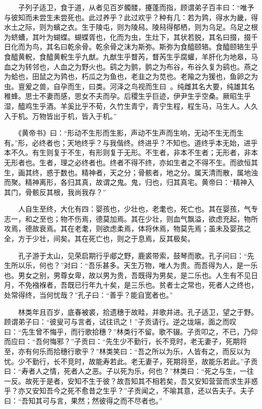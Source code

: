 　　子列子适卫，食于道，从者见百岁髑髅，攓蓬而指，顾谓弟子百丰曰：``唯予与彼知而未尝生未尝死也。此过养乎？此过欢乎？种有几：若为鹑，得水为畿，得水土之际，则为蠙之衣。生于陵屯，则为陵舄。陵舄得郁栖，则为乌足。乌足之根为蛴螬，其叶为蝴蝶。蝴蝶胥也，化而为虫，生灶下，其状若脱，其名曰掇，掇千日化而为鸟，其名曰乾余骨。乾余骨之沫为斯弥。斯弥为食醯颐辂。食醯颐辂生乎食醯黄軦，食醯黄軦生乎九猷。九猷生乎瞀芮，瞀芮生乎腐蠸，羊肝化为地皋，马血之为转邻也，人血之为野火也。鹞之为鹯，鹯之为布谷，布谷久复为鹞也。燕之为蛤也，田鼠之为鹑也，朽瓜之为鱼也，老韭之为苋也。老羭之为猨也，鱼卵之为虫。亶爰之兽，自孕而生，曰类。河泽之鸟视而生曰。纯雌其名大要，纯雄其名稚蜂。思士不妻而感，思女不夫而孕。后稷生乎巨迹，伊尹生乎空桑。厥昭生乎湿，醯鸡生乎酒。羊奚比乎不荀，久竹生青宁，青宁生程，程生马，马生人。人久入于机。万物皆出于机，皆入于机。''

　　《黄帝书》曰：``形动不生形而生影，声动不生声而生响，无动不生无而生有。''形，必终者也；天地终乎？与我偕终。终进乎？不知也。道终乎本无始，进乎本不久。有生则复于不生，有形则复于无形。不生者，非本不生者；无形者，非本无形者也。生者，理之必终者也。终者不得不终，亦如生者之不得不生。而欲恒其生，画其终，惑于数也。精神者，天之分；骨骸者，地之分。属天清而散，属地浊而聚。精神离形，各归其真，故谓之鬼。鬼，归也，归其真宅。黄帝曰：``精神入其门，骨骸反其根，我尚我存？''

　　人自生至终，大化有四：婴孩也，少壮也，老耄也，死亡也。其在婴孩，气专志一，和之至也；物不伤焉，德莫加焉。其在少壮，则血气飘溢，欲虑充起，物所攻焉，德故衰焉。其在老耄，则欲虑柔焉，体将休焉，物莫先焉；虽未及婴孩之全，方于少壮，间矣。其在死亡也，则之于息焉，反其极矣。

　　孔子游于太山，见荣启期行乎郕之野，鹿裘带索，鼓琴而歌。孔子问曰：``先生所以乐，何也？''对曰：``吾乐甚多。天生万物，唯人为贵。而吾得为人，是一乐也。男女之别，男尊女卑，故以男为贵，吾既得为男矣，是二乐也。人生有不见日月，不免襁褓者，吾既已行年九十矣，是三乐也。贫者士之常也，死者人之终也，处常得终，当何忧哉？''孔子曰：``善乎？能自宽者也。''

　　林类年且百岁，底春被裘，拾遗穗于故畦，并歌并进。孔子适卫，望之于野。顾谓弟子曰：``彼叟可与言者，试往讯之！''子贡请行。逆之垅端，面之而叹曰：``先生曾不悔乎，而行歌拾穗？''林类行不留。歌不辍。子贡叩之，不已，乃仰而应曰：``吾何悔邪？''子贡曰：``先生少不勤行，长不竞时，老无妻子，死期将至，亦有何乐而拾穗行歌乎？''林类笑曰：``吾之所以为乐，人皆有之，而反以为忧。少不勤行，长不竞时，故能寿若此。老无妻子，死期将至，故能乐若此。''子贡曰：``寿者人之情，死者人之恶。子以死为乐，何也？''林类曰：``死之与生，一往一反。故死于是者，安知不生于彼？故吾知其不相若矣，吾又安知营营而求生非惑乎？亦又安知吾今之死不愈昔之生乎？''子贡闻之，不喻其意，还以告夫子。夫子曰：``吾知其可与言，果然；然彼得之而不尽者也。''

